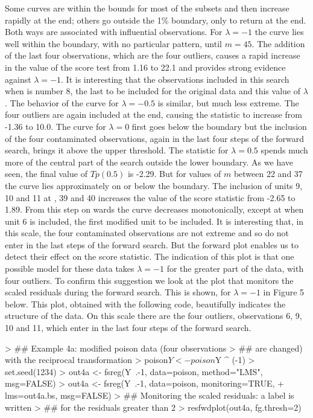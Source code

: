 \documentclass[article,shortnames,nojss]{jss}
\begin{document}
Some curves are within the bounds for most of the subsets and then increase rapidly at the end; others go outside the 1\% boundary, only to return at the end. Both ways are associated with influential observations. For $\lambda=-1$ the curve lies well within the boundary, with no particular pattern, until $m=45$. The addition of the last four observations, which are the four outliers, causes a rapid increase in the value of the score test from 1.16 to 22.1 and provides strong evidence against $\lambda=-1$. It is interesting that the observations included in this search when  is number 8, the last to be included for the original data and this value of $\lambda$. The behavior of the curve for $\lambda=-0.5$ is similar, but much less extreme. The four outliers are again included at the end, causing the statistic to increase from -1.36 to 10.0. The curve for $\lambda=0$ first goes below the boundary but the inclusion of the four contaminated observations, again in the last four steps of the forward search, brings it above the upper threshold. The statistic for $\lambda=0.5$ spends much more of the central part of the search outside the lower boundary. As we have seen, the final value of $Tp(0.5)$ is -2.29. But for values of $m$ between 22 and 37 the curve lies approximately on or below the boundary. The inclusion of units 9, 10 and 11 at , 39 and 40 increases the value of the score statistic from -2.65 to 1.89. From this step on wards the curve decreases monotonically, except at  when unit 6 is included, the first modified unit to be included. It is interesting that, in this scale, the four contaminated observations are not extreme and so do not enter in the last steps of the forward search. But the forward plot enables us to detect their effect on the score statistic. The indication of this plot is that one possible model for these data takes $\lambda=-1$ for the greater part of the data, with four outliers. To confirm this suggestion we look at the plot that monitors the scaled residuals during the forward search. This is shown, for $\lambda=-1$ in Figure 5 below. This plot, obtained with the following code, beautifully indicates the structure of the data. On this scale there are the four outliers, observations 6, 9, 10 and 11, which enter in the last four steps of the forward search.


\begin{Schunk}
\begin{Sinput}
> ##  Example 4a: modified poison data (four observations
> ##  are changed) with the reciprocal transformation
> poison$Y <- poison$Y ^ (-1)
> set.seed(1234)
> out4a <- fsreg(Y~.-1, data=poison, method="LMS", msg=FALSE)
> out4a <- fsreg(Y~.-1, data=poison, monitoring=TRUE,
+           lms=out4a.bs, msg=FALSE)
> ##  Monitoring the scaled residuals: a label is written
> ##  for the residuals greater than 2
> resfwdplot(out4a, fg.thresh=2)
\end{Sinput}
\end{Schunk}
\end{document}
